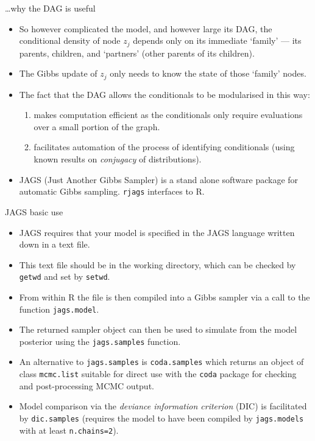 \documentclass{beamer}
\begin{document}
\begin{frame}{\ldots why the DAG is useful}
\begin{itemize}
\item So however complicated the model, and however large its DAG, the conditional density of node $z_j$ depends only on its immediate `family' --- its parents, children, and `partners' (other parents of its children). 
\item The Gibbs update of $z_j$ only needs to know the state of those `family' nodes.
\item The fact that the DAG allows the conditionals to be modularised in this way:
\begin{enumerate}
\item  makes computation efficient as the conditionals only require evaluations over a small portion of the graph.  \item facilitates automation of the process of identifying conditionals (using known results on {\em conjugacy} of distributions).  
\end{enumerate}
\item  JAGS (Just Another Gibbs Sampler) is a stand alone software package for automatic Gibbs sampling. {\tt rjags} interfaces to R.
\end{itemize}
\end{frame}



\begin{frame}{JAGS basic use}
\begin{itemize}
\item JAGS requires that your model is specified in the JAGS language written down in a text file.
\item This text file should be in the working directory, which can be checked by {\tt getwd} and set by {\tt setwd}.
\item From within R the file is then compiled into a Gibbs sampler via a call to the function {\tt jags.model}.
\item The returned sampler object can then be used to simulate from the model posterior using the {\tt jags.samples} function.
\item An alternative to {\tt jags.samples} is {\tt coda.samples} which returns an object of class {\tt mcmc.list} suitable for direct use with the {\tt coda} package for checking and post-processing MCMC output. 
\item Model comparison via the {\em deviance information criterion} (DIC) is facilitated by {\tt dic.samples} (requires the model to have been compiled by {\tt jags.models} with at least {\tt n.chains=2}).
\end{itemize}
\end{frame}
\end{document}
